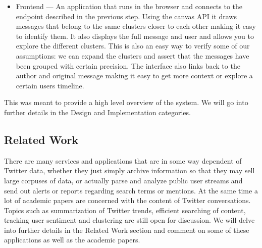 \begin{itemize}
	\item Frontend --- An application that runs in the browser and connects to the endpoint described in the previous step. Using the canvas API it draws messages that belong to the same clusters closer to each other making it easy to identify them. It also displays the full message and user and allows you to explore the different clusters. This is also an easy way to verify some of our assumptions: we can expand the clusters and assert that the messages have been grouped with certain precision. The interface also links back to the author and original message making it easy to get more context or explore a certain users timeline.
\end{itemize}
This was meant to provide a high level overview of the system. We will go into further details in the Design and Implementation categories.

\subsection{Related Work}

There are many services and applications that are in some way dependent of Twitter data, whether they just simply archive information so that they may sell large corpuses of data, or actually parse and analyze public user streams and send out alerts or reports regarding search terms or mentions.
\newline
At the same time a lot of academic papers are concerned with the content of Twitter conversations. Topics such as summarization of Twitter trends, efficient searching of content, tracking user sentiment and clustering are still open for discussion.
\newline
We will delve into further details in the Related Work section and comment on some of these applications as well as the academic papers.